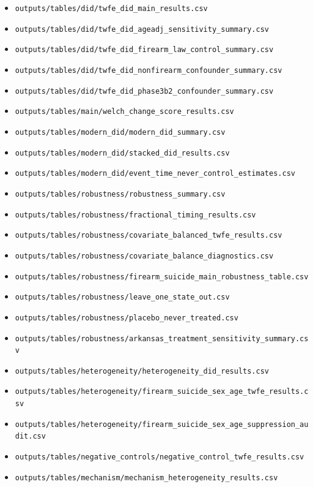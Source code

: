 \documentclass[10pt]{article}
\begin{document}
\begin{itemize}
\item \texttt{outputs/tables/did/twfe\_did\_main\_results.csv}
\item \texttt{outputs/tables/did/twfe\_did\_ageadj\_sensitivity\_summary.csv}
\item \texttt{outputs/tables/did/twfe\_did\_firearm\_law\_control\_summary.csv}
\item \texttt{outputs/tables/did/twfe\_did\_nonfirearm\_confounder\_summary.csv}
\item \texttt{outputs/tables/did/twfe\_did\_phase3b2\_confounder\_summary.csv}
\item \texttt{outputs/tables/main/welch\_change\_score\_results.csv}
\item \texttt{outputs/tables/modern\_did/modern\_did\_summary.csv}
\item \texttt{outputs/tables/modern\_did/stacked\_did\_results.csv}
\item \texttt{outputs/tables/modern\_did/event\_time\_never\_control\_estimates.csv}
\item \texttt{outputs/tables/robustness/robustness\_summary.csv}
\item \texttt{outputs/tables/robustness/fractional\_timing\_results.csv}
\item \texttt{outputs/tables/robustness/covariate\_balanced\_twfe\_results.csv}
\item \texttt{outputs/tables/robustness/covariate\_balance\_diagnostics.csv}
\item \texttt{outputs/tables/robustness/firearm\_suicide\_main\_robustness\_table.csv}
\item \texttt{outputs/tables/robustness/leave\_one\_state\_out.csv}
\item \texttt{outputs/tables/robustness/placebo\_never\_treated.csv}
\item \texttt{outputs/tables/robustness/arkansas\_treatment\_sensitivity\_summary.csv}
\item \texttt{outputs/tables/heterogeneity/heterogeneity\_did\_results.csv}
\item \texttt{outputs/tables/heterogeneity/firearm\_suicide\_sex\_age\_twfe\_results.csv}
\item \texttt{outputs/tables/heterogeneity/firearm\_suicide\_sex\_age\_suppression\_audit.csv}
\item \texttt{outputs/tables/negative\_controls/negative\_control\_twfe\_results.csv}
\item \texttt{outputs/tables/mechanism/mechanism\_heterogeneity\_results.csv}

\end{itemize}
\end{document}

